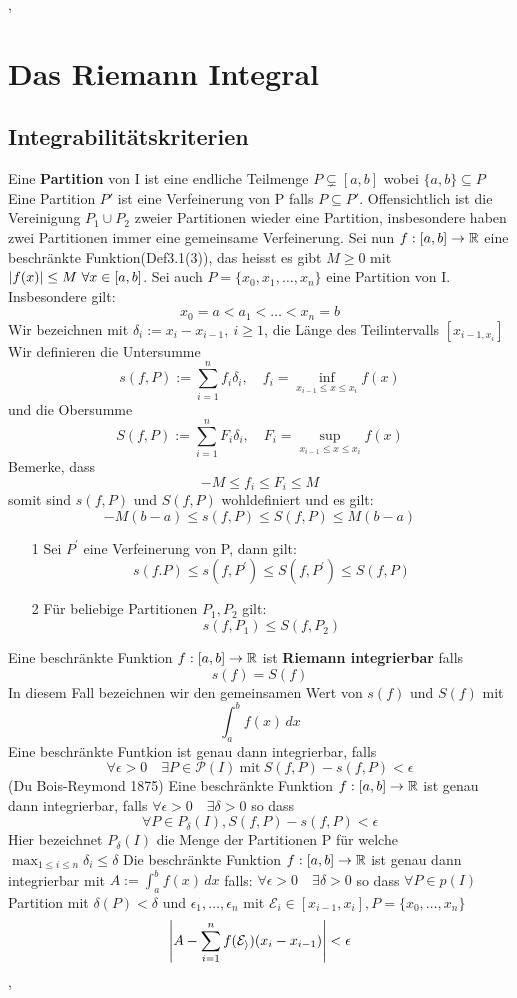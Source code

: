 \sep
\section{Das Riemann Integral}
\subsection{Integrabilitätskriterien}
\Def[5.1] Eine \textbf{Partition} von I ist eine endliche Teilmenge \(P \subsetneq[a, b]\) wobei \(\{a,b\} \subseteq P\)
Eine Partition \(P'\) ist eine Verfeinerung von P falls \( P \subseteq P'\). Offensichtlich ist die Vereinigung \( P_1 \cup P_2\) zweier Partitionen wieder eine Partition, insbesondere haben zwei Partitionen immer eine gemeinsame Verfeinerung.
Sei nun \( f:[a,b] \rightarrow \mathbb{R}\) eine beschränkte Funktion(Def3.1(3)), das heisst es gibt \( M \geq 0\) mit \( \left\lvert f(x) \right\rvert \leq M \ \forall x \in [a,b]\). Sei auch \( P= \{x_0, x_1, \dots, x_n\}\) eine Partition von I. Insbesondere gilt:
\[ x_0 = a < a_1 < \dots < x_n =b\]
Wir bezeichnen mit \( \delta_i := x_i - x_{i-1}, \ i \geq 1\), die Länge des Teilintervalls \([x_{i-1,x_i}] \)
Wir definieren die Untersumme
\[s(f,P) := \sum_{i=1}^n f_i \delta_i, \quad f_i = \inf_{x_{i-1} \leq x \leq x_i} f(x)\]
und die Obersumme
\[S(f,P) := \sum_{i=1}^n F_i \delta_i, \quad F_i = \sup_{x_{i-1} \leq x \leq x_i} f(x)\]
Bemerke, dass
\[ -M \leq f_i \leq F_i \leq M\]
somit sind \(s(f,P)\) und \(S(f,P)\) wohldefiniert und es gilt:
\[ -M(b-a) \leq s(f,P) \leq S(f,P) \leq M(b-a)\]
\Lemma[5.2]
\begin{enumerate}
    \item [1] Sei \(P^{'}\) eine Verfeinerung von P, dann gilt:
    \[s(f.P) \leq s(f,P^{'}) \leq S(f, P^{'}) \leq S(f,P)\]
    \item [2] Für beliebige Partitionen \(P_1, P_2\) gilt:
    \[s(f,P_1) \leq S(f, P_2)\]
\end{enumerate}
\Def[5.3] Eine beschränkte Funktion \(f: [a,b] \rightarrow \mathbb{R} \) ist \textbf{Riemann integrierbar} falls
\[s(f) = S(f)\]
In diesem Fall bezeichnen wir den gemeinsamen Wert von \(s(f)\) und \(S(f)\) mit
\[ \int_{a}^{b} f(x) \,dx \]
\Satz[5.4] Eine beschränkte Funtkion ist genau dann integrierbar, falls
\[ \forall \epsilon > 0 \quad \exists P \in \mathcal{P}(I) \ \text{mit} \ S(f,P) - s(f,P) < \epsilon \] 
\Satz[5.8](Du Bois-Reymond 1875)
Eine beschränkte Funktion \(f : [a,b] \rightarrow \mathbb{R} \) ist genau dann integrierbar, falls \( \forall \epsilon > 0 \quad \exists \delta > 0\) so dass
\[ \forall P \in P_{\delta}(I), S(f, P) - s(f, P ) < \epsilon \]
Hier bezeichnet \( P_\delta (I)\) die Menge der Partitionen P für welche \( \max_{1 \leq i \leq n} \delta_i \leq \delta\) \newline
\Korollar[5.9] Die beschränkte Funktion \(f: [a,b] \rightarrow \mathbb{R} \) ist genau dann integrierbar mit \(A:= \int_{a}^{b} f(x) \,dx\) falls:
\( \forall \epsilon > 0 \quad \exists \delta > 0 \) so dass \( \forall P \in p(I) \) Partition mit \( \delta(P) < \delta \) und \( \epsilon_1, \dots, \epsilon_n\) mit
\(\mathcal{E}_i \in [x_{i-1}, x_i], P= \{x_0, \dots, x_n\}\)
\[\left\lvert  A - \sum_{i=1}^n f(\mathcal{E_i}) ( x_i - x_{i-1})  \right\rvert < \epsilon \]
\sep
